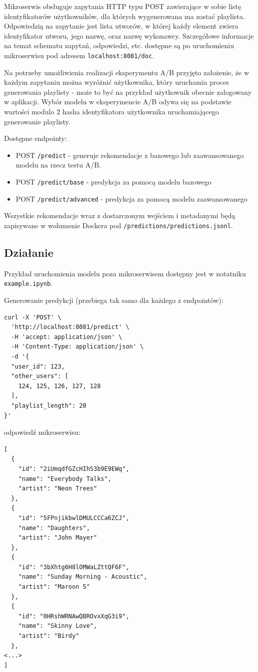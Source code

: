 \documentclass[10pt,a4paper]{article}
\begin{document}
Mikroserwis obsługuje zapytania HTTP typu POST zawierające w sobie listę identyfikatorów użytkowników, dla których wygenerowana ma zostać playlista. Odpowiedzią na zapytanie jest lista utworów, w której każdy element zwiera identyfikator utworu, jego nazwę, oraz nazwę wykonawcy. Szczegółowe informacje na temat schematu zapytań, odpowiedzi, etc. dostępne są po uruchomieniu mikroserwisu pod adresem \texttt{localhost:8081/doc}.

Na potrzeby umożliwienia realizacji eksperymentu A/B przyjęto założenie, że w każdym zapytaniu można wyróżnić użytkownika, który uruchamia proces generowania playlisty - może to być na przykład użytkownik obecnie zalogowany w aplikacji. Wybór modelu w eksperymencie A/B odywa się na podstawie wartości modulo $2$ hasha identyfikatora użytkownika uruchamiającego generowanie playlisty.

Dostępne endpointy:
\begin{itemize}
\item POST \texttt{/predict} - generuje rekomendacje z bazowego lub zaawansowanego modelu na rzecz testu A/B. 
\item POST \texttt{/predict/base} - predykcja za pomocą modelu bazowego
\item POST \texttt{/predict/advanced} - predykcja za pomocą modelu zaawansowanego
\end{itemize}

Wszystkie rekomendacje wraz z dostarczonym wejściem i metadanymi będą zapisywane w wolumenie Dockera pod \texttt{/predictions/predictions.jsonl}.


\subsection*{Działanie}

Przykład uruchomienia modelu poza mikroserwisem dostępny jest w notatniku \texttt{example.ipynb}.

Generowanie predykcji (przebiega tak samo dla każdego z endpointów):

\begin{verbatim}
curl -X 'POST' \
  'http://localhost:8081/predict' \
  -H 'accept: application/json' \
  -H 'Content-Type: application/json' \
  -d '{
  "user_id": 123,
  "other_users": [
    124, 125, 126, 127, 128
  ],
  "playlist_length": 20
}'
\end{verbatim}

odpowiedź mikroserwisu:

\begin{verbatim}
[
  {
    "id": "2iUmqdfGZcHIhS3b9E9EWq",
    "name": "Everybody Talks",
    "artist": "Neon Trees"
  },
  {
    "id": "5FPnjikbwlDMULCCCa6ZCJ",
    "name": "Daughters",
    "artist": "John Mayer"
  },
  {
    "id": "3bXhtg6H8lOMWaLZttQF6F",
    "name": "Sunday Morning - Acoustic",
    "artist": "Maroon 5"
  },
  {
    "id": "0HRshWRNAwQBROvxXqG3i9",
    "name": "Skinny Love",
    "artist": "Birdy"
  },
<...>
]
\end{verbatim}
\end{document}
